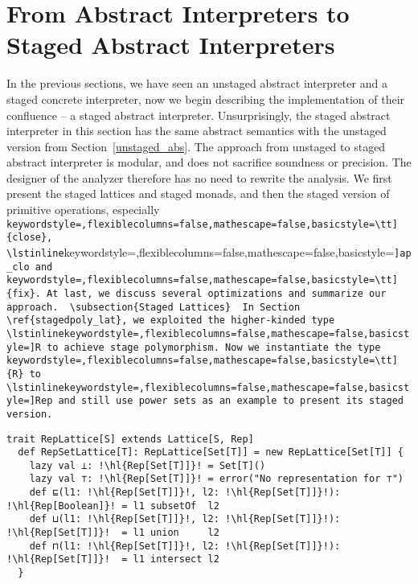 \section{From Abstract Interpreters to Staged Abstract Interpreters} \label{sai}

In the previous sections, we have seen an unstaged abstract interpreter and a
staged concrete interpreter, now we begin describing the implementation of their
confluence -- a staged abstract interpreter.
Unsurprisingly, the staged abstract interpreter in this section has the same
abstract semantics with the unstaged version from Section~\ref{unstaged_abs}.
The approach from unstaged to staged abstract interpreter is modular,
and does not sacrifice soundness or precision. The designer of the
analyzer therefore has no need to rewrite the analysis. We first present the
staged lattices and staged monads, and then the staged version of primitive
operations, especially \lstinline[keywordstyle=,flexiblecolumns=false,mathescape=false,basicstyle=\tt]{close}, \lstinline[keywordstyle=,flexiblecolumns=false,mathescape=false,basicstyle=\tt]{ap_clo} and \lstinline[keywordstyle=,flexiblecolumns=false,mathescape=false,basicstyle=\tt]{fix}. At last, we discuss several
optimizations and summarize our approach.

\subsection{Staged Lattices}

In Section \ref{stagedpoly_lat}, we exploited the higher-kinded type \lstinline[keywordstyle=,flexiblecolumns=false,mathescape=false,basicstyle=\tt]{R} to
achieve stage polymorphism. Now we instantiate the type \lstinline[keywordstyle=,flexiblecolumns=false,mathescape=false,basicstyle=\tt]{R} to \lstinline[keywordstyle=,flexiblecolumns=false,mathescape=false,basicstyle=\tt]{Rep} and
still use power sets as an example to present its staged version.
\begin{lstlisting}[escapechar=!]
  trait RepLattice[S] extends Lattice[S, Rep]
  def RepSetLattice[T]: RepLattice[Set[T]] = new RepLattice[Set[T]] {
    lazy val ⊥: !\hl{Rep[Set[T]]}! = Set[T]()
    lazy val ⊤: !\hl{Rep[Set[T]]}! = error("No representation for ⊤")
    def ⊑(l1: !\hl{Rep[Set[T]]}!, l2: !\hl{Rep[Set[T]]}!): !\hl{Rep[Boolean]}! = l1 subsetOf  l2
    def ⊔(l1: !\hl{Rep[Set[T]]}!, l2: !\hl{Rep[Set[T]]}!): !\hl{Rep[Set[T]]}!  = l1 union     l2
    def ⊓(l1: !\hl{Rep[Set[T]]}!, l2: !\hl{Rep[Set[T]]}!): !\hl{Rep[Set[T]]}!  = l1 intersect l2
  }
\end{lstlisting}

